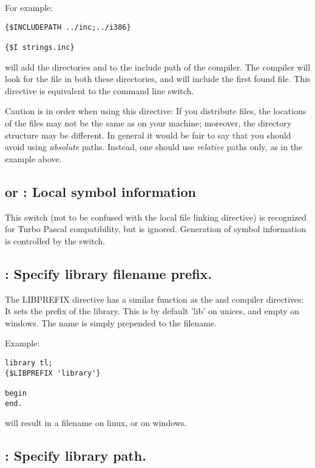 For example:
\begin{verbatim}
{$INCLUDEPATH ../inc;../i386}

{$I strings.inc}
\end{verbatim}

will add the directories  and  to the include
path of the compiler. The compiler will look for the file 
in both these directories, and will include the first found file. This directive is
equivalent to the  command line switch.

Caution is in order when using this directive: If you distribute files, the
locations of the files may not be the same as on your machine; moreover, the
directory structure may be different. In general it would be fair to say
that you should avoid using {\em absolute} paths. Instead, one should use 
{\em relative} paths only, as in the example above. 

\subsection{ or  : Local symbol information}

This switch (not to be confused with the local  file linking
directive) is recognized for Turbo Pascal compatibility, but is ignored.
Generation of symbol information is controlled by the  switch.

\subsection{ : Specify library filename prefix.}
The LIBPREFIX directive has a similar function as the  and
 compiler directives: It sets the prefix of the library. 
This is by default 'lib' on unices, and empty on windows. The name is simply
prepended to the filename.

Example:
\begin{verbatim}
library tl;
{$LIBPREFIX 'library'}

begin
end.
\end{verbatim}
will result in a filename  on linux, or
 on windows.


\subsection{ : Specify library path.}

